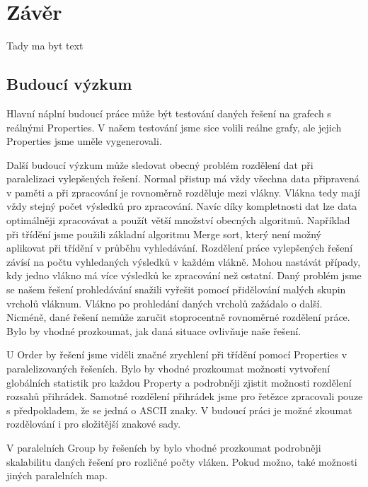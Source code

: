 \chapter{Závěr}

Tady ma byt text

\section{Budoucí výzkum}

Hlavní náplní budoucí práce může být testování daných řešení na grafech s reálnými Properties.
V našem testování jsme sice volili reálne grafy, ale jejich Properties jsme uměle vygenerovali.

Další budoucí výzkum může sledovat obecný problém rozdělení dat při paralelizaci vylepšených řešení. 
Normal přistup má vždy všechna data připravená v paměti a při zpracování je rovnoměrně rozděluje mezi vlákny.
Vlákna tedy mají vždy stejný počet výsledků pro zpracování.
Navíc díky kompletnosti dat lze data optimálněji zpracovávat a použít větší množství obecných algoritmů.
Například při třídění jsme použili základní algoritmu Merge sort, který není možný aplikovat při třídění v průběhu vyhledávání.  
Rozdělení práce vylepšených řešení závísí na počtu vyhledaných výsledků v každém vlákně.
Mohou nastávát případy, kdy jedno vlákno má více výsledků ke zpracování než ostatní. 
Daný problém jsme se našem řešení prohledávání snažili vyřešit pomocí přidělování malých skupin vrcholů vláknum.
Vlákno po prohledání daných vrcholů zažádalo o další.
Nicméně, dané řešení nemůže zaručit stoprocentně rovnoměrné rozdělení práce.
Bylo by vhodné prozkoumat, jak daná situace ovlivňuje naše řešení.

U Order by řešení jsme viděli značné zrychlení při třídění pomocí Properties v paralelizovaných řešeních.
Bylo by vhodné prozkoumat možnosti vytvoření globálních statistik pro každou Property a podrobněji zjistit možnosti rozdělení rozsahů přihrádek.
Samotné rozdělení přihrádek jsme pro řetězce zpracovali pouze s předpokladem, že se jedná o ASCII znaky.
V budoucí práci je možné zkoumat rozdělování i pro složitější znakové sady.

V paralelních Group by řešeních by bylo vhodné prozkoumat podrobněji skalabilitu daných řešení pro rozličné počty vláken.
Pokud možno, také možnosti jiných paralelních map. 